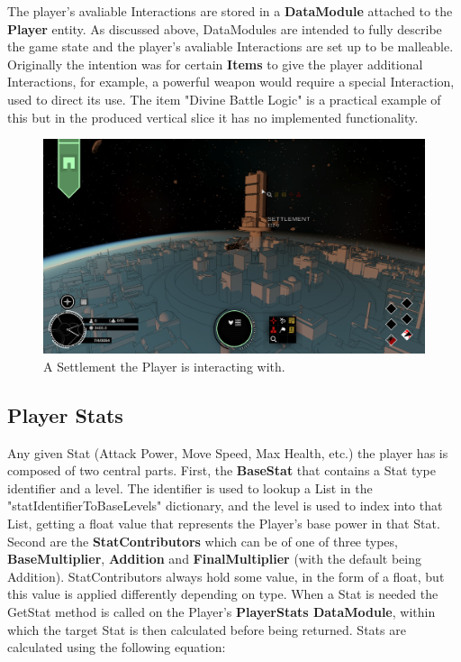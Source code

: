 \documentclass{report}
\begin{document}
The player's avaliable Interactions are stored in a \textbf{DataModule} attached to the \textbf{Player} entity. As discussed above, DataModules are intended to fully describe the game state and the player's avaliable Interactions are set up to be malleable. Originally the intention was for certain \textbf{Items} to give the player additional Interactions, for example, a powerful weapon would require a special Interaction, used to direct its use. The item "Divine Battle Logic" is a practical example of this but in the produced vertical slice it has no implemented functionality.

\begin{figure}[H]
	\centering
    \includegraphics[width=.9\textwidth]{interactionExample.png}
    \caption{A Settlement the Player is interacting with.}
\end{figure}

\subsection{Player Stats}

Any given Stat (Attack Power, Move Speed, Max Health, etc.) the player has is composed of two central parts. First, the \textbf{BaseStat} that contains a Stat type identifier and a level. The identifier is used to lookup a List in the "statIdentifierToBaseLevels" dictionary, and the level is used to index into that List, getting a float value that represents the Player's base power in that Stat. Second are the \textbf{StatContributors} which can be of one of three types, \textbf{BaseMultiplier}, \textbf{Addition} and \textbf{FinalMultiplier} (with the default being Addition). StatContributors always hold some value, in the form of a float, but this value is applied differently depending on type. When a Stat is needed the GetStat method is called on the Player's \textbf{PlayerStats DataModule}, within which the target Stat is then calculated before being returned. Stats are calculated using the following equation:
\end{document}
